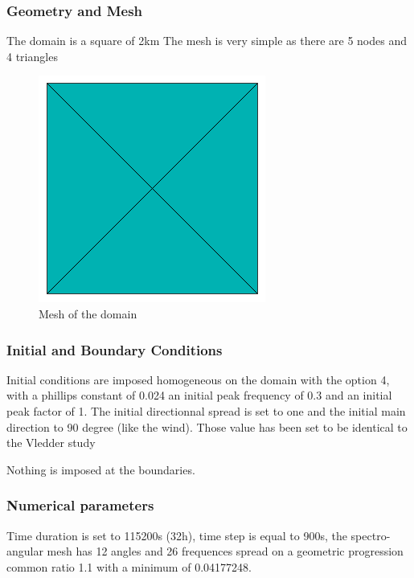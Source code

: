 \subsubsection{Geometry and Mesh}
%
The domain is a square of 2km 
The mesh is very simple as there are 5 nodes and 4 triangles 
\begin{figure} [!h]
\centering
\includegraphics[scale = 0.65]{maillage.png}
 \caption{Mesh of the domain}
\label{mailTW}
\end{figure}
%
%
\subsubsection{Initial and Boundary Conditions}
%
Initial conditions are imposed homogeneous on the domain with the option 4, with a phillips constant of 0.024 an initial peak frequency of 0.3  and an initial peak factor of 1.  The initial directionnal spread is set to one and the initial main direction to 90 degree (like the wind). 
Those value has been set to be identical to the Vledder study \cite{vledder}

Nothing is imposed at the boundaries. 
%
%
\subsubsection{Numerical parameters}
Time duration is set to 115200s (32h), time step is equal to 900s, the spectro-angular mesh has 12 angles and 26 frequences spread on a geometric progression common ratio 1.1 with a minimum of 0.04177248. 

